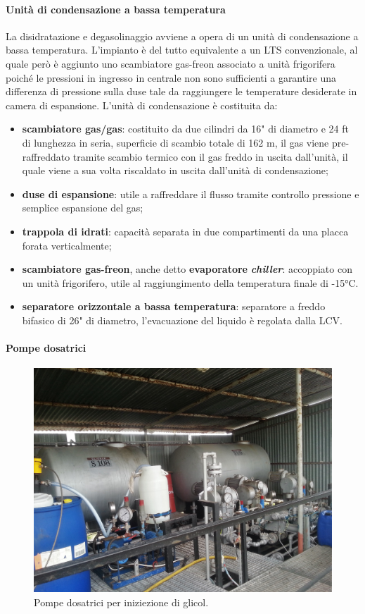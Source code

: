 \paragraph{Unità di condensazione a bassa temperatura}
La disidratazione e degasolinaggio avviene a opera di un unità di condensazione a bassa temperatura. L'impianto è del tutto equivalente a un LTS convenzionale, al quale però è aggiunto uno scambiatore gas-freon associato a unità frigorifera poiché le pressioni in ingresso in centrale non sono sufficienti a garantire una differenza di pressione sulla duse tale da raggiungere le temperature desiderate in camera di espansione. L'unità di condensazione è costituita da:
\begin{itemize}
	\item \textbf{scambiatore gas/gas}: costituito da due cilindri da 16" di diametro e 24 ft di lunghezza in seria, superficie di scambio totale di 162 m, il gas viene pre-raffreddato tramite scambio termico con il gas freddo in uscita dall'unità, il quale viene a sua volta riscaldato in uscita dall'unità di condensazione;
	\item \textbf{duse di espansione}: utile a raffreddare il flusso tramite controllo pressione e semplice espansione del gas;
	\item \textbf{trappola di idrati}: capacità separata in due compartimenti da una placca forata verticalmente;
	\item \textbf{scambiatore gas-freon}, anche detto \textbf{evaporatore} \textbf{\textit{chiller}}: accoppiato con un unità frigorifero, utile al raggiungimento della temperatura finale di -15°C.
	\item \textbf{separatore orizzontale a bassa temperatura}: separatore a freddo bifasico di 26" di diametro, l'evacuazione del liquido è regolata dalla LCV.
\end{itemize}
\paragraph{Pompe dosatrici}
\begin{figure}[htbp] %
    \centering
    \includegraphics[width=\textwidth]{fig/test/centrale/glicol1.jpg}
    \caption{Pompe dosatrici per iniziezione di glicol.} 
    \label{fig:glicolpump}
\end{figure}
